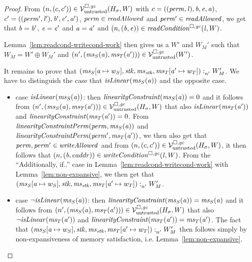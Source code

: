 \begin{proof}
  From $\npair{(c,c')}\in\lrv(H_\sigma,W)$ with $c = ((\perm,\lin),\baddr,\eaddr,\aaddr)$, $c' = ((\perm',\lin'),\baddr',\eaddr',\aaddr')$, $\perm \in \readAllowed{}$ and $\perm' \in \readAllowed{}$, we get that $\baddr = \baddr'$, $\eaddr = \eaddr'$ and $\aaddr = \aaddr'$ and $\npair{(\baddr,\eaddr)} \in \readCond{\lin,W}$.

  Lemma~\ref{lem:readcond-writecond-work} then gives us a $W'$ and $W_M'$ such that $W_M = W' \oplus W_M'$ and $\npair[n']{(\ms_S(\aaddr),\ms_T(\aaddr'))} \in \lrv(W')$.
  
  It remains to prove that $\memSat[n']{(\ms_S\update{\aaddr}{w_S},\stk,\ms_\stk,\ms_T\update{\aaddr'}{w_T})}{W_M'}$.
  We have to distinguish the case that $\isLinear{\ms_S(\aaddr)}$ and the opposite case.
  \begin{itemize}
  \item case $\isLinear{\ms_S(\aaddr)}$: then $\linCons{\ms_S(\aaddr)} = 0$ and it follows from $\npair[n']{(\ms_S(\aaddr),\ms_T(\aaddr'))}\in\lrv(H_\sigma,W)$ that also $\isLinear{\ms_T(\aaddr')}$  and $\linCons{\ms_T(\aaddr')} = 0$. 
    From $\linConsPerm{\perm}{\ms_S(\aaddr)}$ and $\linConsPerm{\perm'}{\ms_T(\aaddr')}$, we then also get that $\perm,\perm' \in \writeAllowed{}$ and from $\npair{(c,c')}\in\lrv(H_\sigma,W)$, it then follows that $\npair{(\baddr,eaddr)} \in \writeCond{\lin,W}$.
    From the ``Additionally, if..'' case in Lemma~\ref{lem:readcond-writecond-work} with Lemma~\ref{lem:non-expansive}, we then get that $\memSat[n']{(\ms_S\update{\aaddr}{w_S},\stk,\ms_\stk,\ms_T\update{\aaddr'}{w_T})}{W_M'}$.

  \item case $\neg\isLinear{\ms_S(\aaddr)}$: then $\linCons{\ms_S(\aaddr)} = \ms_S(\aaddr)$ and it follows from $\npair[n']{(\ms_S(\aaddr),\ms_T(\aaddr'))}\in\lrv(H_\sigma,W)$ that also $\neg\isLinear{\ms_T(\aaddr')}$  and $\linCons{\ms_T(\aaddr')} = \ms_T(\aaddr')$.
    The fact that $\memSat[n']{(\ms_S\update{\aaddr}{w_S},\stk,\ms_\stk,\ms_T\update{\aaddr'}{w_T})}{W_M'}$ then follows simply by non-expansiveness of memory satisfaction, i.e. Lemma~\ref{lem:non-expansive}.
  \end{itemize}
\end{proof}


